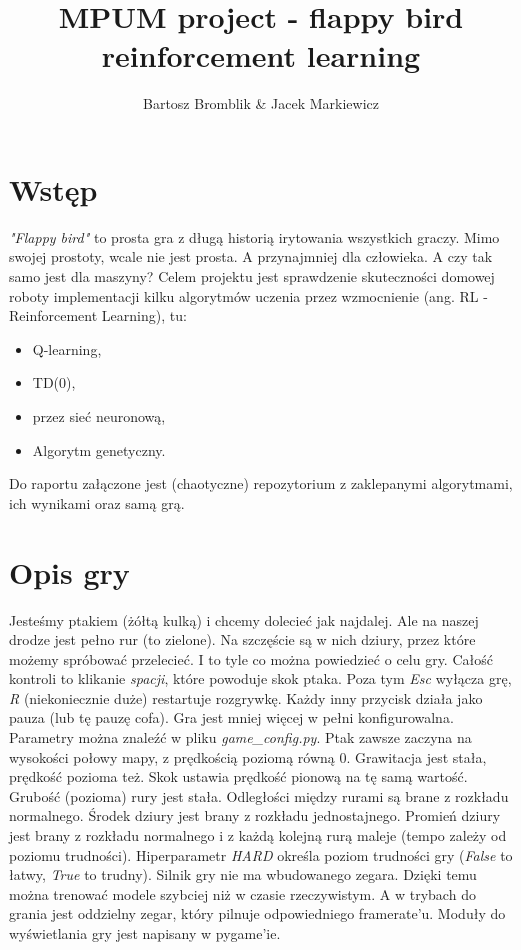 \documentclass[12pt, A4]{article}
\title{MPUM project - flappy bird reinforcement learning}
\author{Bartosz Bromblik \& Jacek Markiewicz}
\date{}
\begin{document}
\maketitle


\section{Wstęp}
\textit{"Flappy bird"} to prosta gra z długą historią irytowania wszystkich graczy. Mimo swojej prostoty, wcale nie jest prosta. A przynajmniej dla człowieka. A czy tak samo jest dla maszyny?
\newline
Celem projektu jest sprawdzenie skuteczności domowej roboty implementacji kilku algorytmów uczenia przez wzmocnienie (ang. RL - Reinforcement Learning), tu:
\begin{itemize}
	\item Q-learning,
	\item TD(0),
	\item przez sieć neuronową,
	\item Algorytm genetyczny.
\end{itemize}
Do raportu załączone jest (chaotyczne) repozytorium z zaklepanymi algorytmami, ich wynikami oraz samą grą.


\section{Opis gry}
Jesteśmy ptakiem (żółtą kulką) i chcemy dolecieć jak najdalej. Ale na naszej drodze jest pełno rur (to zielone). Na szczęście są w nich dziury, przez które możemy spróbować przelecieć. I to tyle co można powiedzieć o celu gry.
\newline
Całość kontroli to klikanie \textit{spacji}, które powoduje skok ptaka. Poza tym \textit{Esc} wyłącza grę, \textit{R} (niekoniecznie duże) restartuje rozgrywkę. Każdy inny przycisk działa jako pauza (lub tę pauzę cofa).
\newline\newline
Gra jest mniej więcej w pełni konfigurowalna. Parametry można znaleźć w pliku \textit{game\_config.py}.
\newline
Ptak zawsze zaczyna na wysokości połowy mapy, z prędkością poziomą równą $0$. Grawitacja jest stała, prędkość pozioma też. Skok ustawia prędkość pionową na tę samą wartość.
\newline
Grubość (pozioma) rury jest stała. Odległości między rurami są brane z rozkładu normalnego. Środek dziury jest brany z rozkładu jednostajnego. Promień dziury jest brany z rozkładu normalnego i z każdą kolejną rurą maleje (tempo zależy od poziomu trudności).
\newline\newline
Hiperparametr \textit{HARD} określa poziom trudności gry (\textit{False} to łatwy, \textit{True} to trudny). 
\newline\newline
Silnik gry nie ma wbudowanego zegara. Dzięki temu można trenować modele szybciej niż w czasie rzeczywistym. A w trybach do grania jest oddzielny zegar, który pilnuje odpowiedniego framerate'u.
\newline
Moduły do wyświetlania gry jest napisany w pygame'ie.
\end{document}
